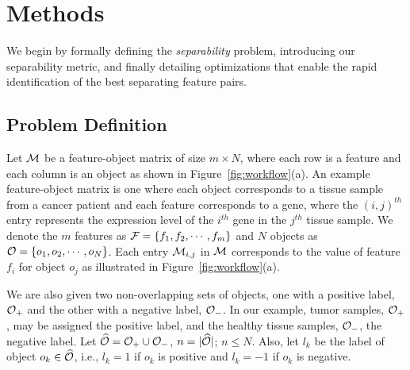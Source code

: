 \section{Methods}
\label{sec:method}
We begin by formally defining the {\em separability} problem,
introducing our separability metric,
and finally detailing optimizations that enable
the rapid identification of the best separating feature pairs.

\subsection{Problem Definition}\label{sec:prob}

Let ${\mathcal{M}}$ be a feature-object matrix of size $m\times N$,
where each row is a feature and each column is an
object as shown in Figure~\ref{fig:workflow}(a).
An example feature-object matrix is one where
each object corresponds to a tissue sample
from a cancer patient and each feature corresponds to a gene,
where the $(i,j)^{th}$ entry represents the
expression level of the $i^{th}$ gene in the $j^{th}$
tissue sample.
We denote the $m$ features as ${\mathcal{F}}=\{f_1,f_2,\cdots,f_m\}$
and $N$ objects as ${\mathcal{O}}=\{o_1,o_2,\cdots,o_N\}$.
Each entry ${\mathcal{M}}_{i,j}$ in ${\mathcal{M}}$ corresponds
to the value of feature $f_i$ for object $o_j$ as illustrated in Figure~\ref{fig:workflow}(a).

We are also given two non-overlapping sets of objects,
one with a positive label, ${\mathcal{O}}_+$ and the other with a negative label, ${\mathcal{O}}_-$.
In our example, tumor samples, ${\mathcal{O}}_+$,
may be assigned the positive label,
and the healthy tissue samples, ${\mathcal{O}}_-$,
the negative label.
Let $\widehat{{\mathcal{O}}}={\mathcal{O}}_+\cup {\mathcal{O}}_-$, $n=|\widehat{{\mathcal{O}}}|$; $n\leq N$. Also, let $l_k$ be the label of object $o_k\in \widehat{{\mathcal{O}}}$, i.e., $l_k=1$ if $o_k$ is positive and $l_k=-1$ if $o_k$ is negative.

